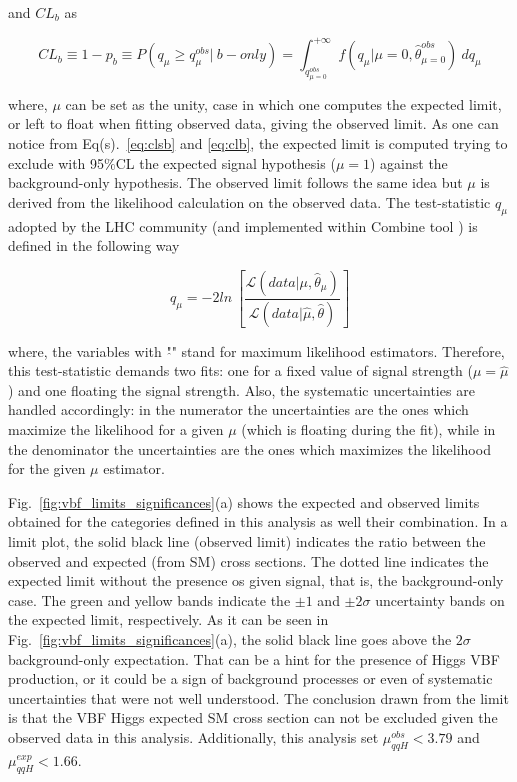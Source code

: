 and $CL_{b}$ as

\begin{equation}
\label{eq:clb}
CL_{b} \equiv 1-p_{b} \equiv P(q_{\mu} \geq q_{\mu}^{obs} | ~b-only) = \int_{q_{\mu=0}^{obs}}^{+\infty} \mathit{f}(q_{\mu} | \mu=0, \hat{\theta}_{\mu=0}^{obs}) ~dq_{\mu}
\end{equation}

where, $\mu$ can be set as the unity, case in which one computes the expected limit, or left to float when fitting observed data, giving the observed limit. As one can notice from Eq(s).~\ref{eq:clsb} and \ref{eq:clb}, the expected limit is computed trying to exclude with 95$\%$CL the expected signal hypothesis ($\mu = 1$) against the background-only hypothesis. The observed limit follows the same idea but $\mu$ is derived from the likelihood calculation on the observed data. The test-statistic $q_{\mu}$ adopted by the LHC community (and implemented within Combine tool \cite{bib:HiggsCombineToolFNALWorkshop2018,bib:Eilam-ESWB-2018-1,bib:Eilam-ESWB-2018-2}) is defined in the following way

\begin{equation}
q_{\mu} = -2ln~\left[ \frac{\mathcal{L}(data|\mu,\hat{\theta}_{\mu})}{\mathcal{L}(data|\hat{\mu},\hat{\theta})} \right]
\end{equation}

where, the variables with "$\hat{}$" stand for maximum likelihood estimators. Therefore, this test-statistic demands two fits: one for a fixed value of signal strength ($\mu = \hat{\mu}$) and one floating the signal strength. Also, the systematic uncertainties are handled accordingly: in the numerator the uncertainties are the ones which maximize the likelihood for a given $\mu$ (which is floating during the fit), while in the denominator the uncertainties are the ones which maximizes the likelihood for the given $\mu$ estimator. 

Fig.~\ref{fig:vbf_limits_significances}(a) shows the expected and observed limits obtained for the categories defined in this analysis as well their combination. In a limit plot, the solid black line (observed limit) indicates the ratio between the observed and expected (from SM) cross sections. The dotted line indicates the expected limit without the presence os given signal, that is, the background-only case. The green and yellow bands indicate the $\pm1$ and $\pm2\sigma$ uncertainty bands on the expected limit, respectively. As it can be seen in Fig.~\ref{fig:vbf_limits_significances}(a), the solid black line goes above the $2\sigma$ background-only expectation. That can be a hint for the presence of Higgs VBF production, or it could be a sign of background processes or even of systematic uncertainties that were not well understood. The conclusion drawn from the limit is that the VBF Higgs expected SM cross section can not be excluded given the observed data in this analysis. Additionally, this analysis set $\mu_{qqH}^{obs} < 3.79$ and $\mu_{qqH}^{exp} < 1.66$.

